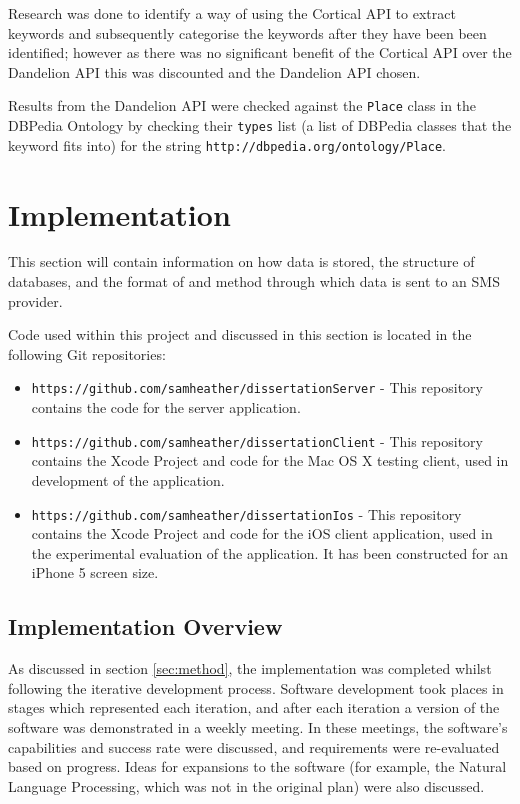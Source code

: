 \documentclass[authoryearcitations]{UoYCSproject}
\begin{document}
Research was done to identify a way of using the Cortical API to extract keywords and subsequently categorise the keywords after they have been been identified; however as there was no significant benefit of the Cortical API over the Dandelion API this was discounted and the Dandelion API chosen.

Results from the Dandelion API were checked against the \texttt{Place} class in the DBPedia Ontology by checking their \texttt{types} list (a list of DBPedia classes that the keyword fits into) for the string \texttt{http://dbpedia.org/ontology/Place}.

\newpage
\chapter{Implementation}
\label{sec:implementation}
This section will contain information on how data is stored, the structure of databases, and the format of and method through which data is sent to an SMS provider.

Code used within this project and discussed in this section is located in the following Git repositories:
\begin{itemize}
  \item \texttt{https://github.com/samheather/dissertationServer} - This repository contains the code for the server application.
  \item \texttt{https://github.com/samheather/dissertationClient} - This repository contains the Xcode Project and code for the Mac OS X testing client, used in development of the application.
  \item \texttt{https://github.com/samheather/dissertationIos} - This repository contains the Xcode Project and code for the iOS client application, used in the experimental evaluation of the application. It has been constructed for an iPhone 5 screen size.
\end{itemize}

\section{Implementation Overview}
As discussed in section \ref{sec:method}, the implementation was completed whilst following the iterative development process. Software development took places in stages which represented each iteration, and after each iteration a version of the software was demonstrated in a weekly meeting. In these meetings, the software's capabilities and success rate were discussed, and requirements were re-evaluated based on progress. Ideas for expansions to the software (for example, the Natural Language Processing, which was not in the original plan) were also discussed.
\end{document}
